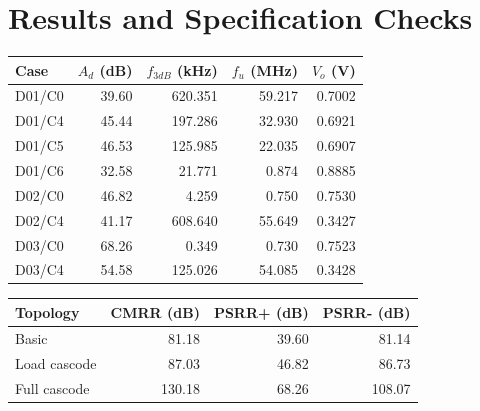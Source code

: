 \section{Results and Specification Checks}
\begin{center}\small\begin{tabular}{lrrrr}\toprule
Case & $A_d$ (dB) & $f_{3dB}$ (kHz) & $f_u$ (MHz) & $V_o$ (V) \\ \midrule
D01/C0 & 39.60 & 620.351 & 59.217 & 0.7002 \\
D01/C4 & 45.44 & 197.286 & 32.930 & 0.6921 \\
D01/C5 & 46.53 & 125.985 & 22.035 & 0.6907 \\
D01/C6 & 32.58 & 21.771 & 0.874 & 0.8885 \\
D02/C0 & 46.82 & 4.259 & 0.750 & 0.7530 \\
D02/C4 & 41.17 & 608.640 & 55.649 & 0.3427 \\
D03/C0 & 68.26 & 0.349 & 0.730 & 0.7523 \\
D03/C4 & 54.58 & 125.026 & 54.085 & 0.3428 \\
\bottomrule\end{tabular}\end{center}
\begin{center}\small\begin{tabular}{lrrr}\toprule
Topology & CMRR (dB) & PSRR+ (dB) & PSRR- (dB) \\ \midrule
Basic & 81.18 & 39.60 & 81.14 \\
Load cascode & 87.03 & 46.82 & 86.73 \\
Full cascode & 130.18 & 68.26 & 108.07 \\
\bottomrule\end{tabular}\end{center}

